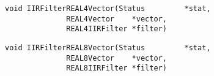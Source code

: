 \vspace{-0.1in}
\begin{verbatim}
void IIRFilterREAL4Vector(Status         *stat,
			  REAL4Vector    *vector,
			  REAL4IIRFilter *filter)
\end{verbatim}
\vspace{-0.1in}
\begin{verbatim}
void IIRFilterREAL8Vector(Status         *stat,
			  REAL8Vector    *vector,
			  REAL8IIRFilter *filter)
\end{verbatim}
